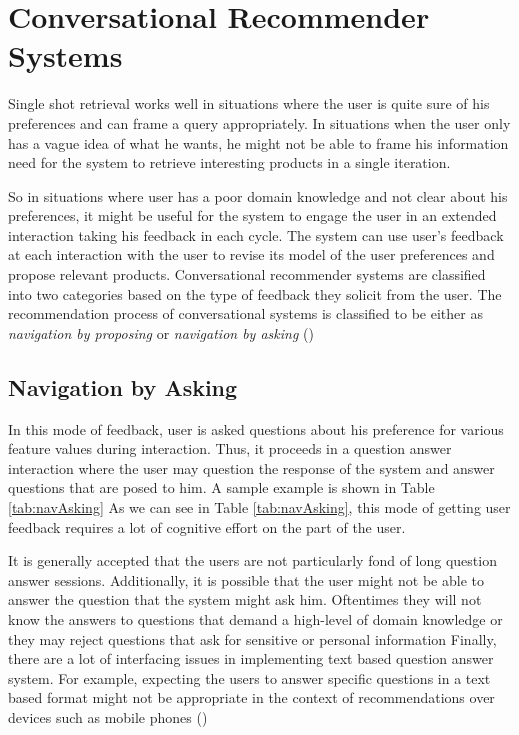\section{Conversational Recommender Systems}
Single shot retrieval works well in situations where the user is quite sure of his preferences and can frame a query appropriately.
In situations when the user only has a vague idea of what he wants, he might not be able to frame his information need for the system to retrieve interesting products in a single iteration. 

So in situations where user has a poor domain knowledge and not clear about his preferences, it might be useful for the system to engage the user in an extended interaction taking his feedback in each cycle.
The system can use user’s feedback at each interaction with the user to revise its model of the user preferences and propose relevant products.
Conversational recommender systems are classified into two categories based on the type of feedback they solicit from the user.
The recommendation process of conversational systems is classified to be either as \textit{navigation by proposing} or \textit{navigation by asking} (\cite{shimazu01})

\subsection{Navigation by Asking}
In this mode of feedback, user is asked questions about his preference for various feature values during interaction.
Thus, it proceeds in a question answer interaction where the user may question the response of the system and answer questions that are posed to him.
A sample example is shown in Table \ref{tab:navAsking}
As we can see in Table \ref{tab:navAsking}, this mode of getting user feedback requires a lot of cognitive effort on the part of the user.

It is generally accepted that the users are not particularly fond of long question answer sessions. 
Additionally, it is possible that the user might not be able to answer the question that the system might ask him. 
Oftentimes they will not know the answers to questions that demand a high-level of domain knowledge or they may reject questions that ask for sensitive or personal information
Finally, there are a lot of interfacing issues in implementing text based question answer system. 
For example, expecting the users to answer specific questions in a text based format might not be appropriate in the context of recommendations over devices such as mobile phones (\cite{smyth2007})

